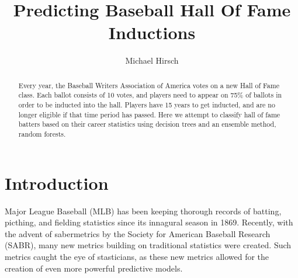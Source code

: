 \documentclass[preprint,12pt]{elsarticle}
\begin{document}
\begin{frontmatter}


\title{Predicting Baseball Hall Of Fame Inductions}




\author{Michael Hirsch}
\address{ILLC, University of Amsterdam}
\address{michaelahirsch@gmail.com}

\begin{abstract}
Every year, the Baseball Writers Association of America votes on a new Hall of Fame class. Each ballot consists of 10 votes, and players need to appear on 75\% of ballots in order to be inducted into the hall. Players have 15 years to get inducted, and are no longer eligible if that time period has passed. Here we attempt to classify hall of fame batters based on their career statistics using decision trees and an ensemble method, random forests.
\end{abstract}


\end{frontmatter}

\section{Introduction}
\label{intro}
Major League Baseball (MLB) has been keeping thorough records of batting, picthing, and fielding statistics since its innagural season in 1869. Recently, with the advent of sabermetrics by the Society for American Baseball Research (SABR), many  new metrics building on traditional statistics were created. Such metrics caught the eye of stasticians, as these new metrics allowed for the creation of even more powerful predictive models. 
\end{document}

